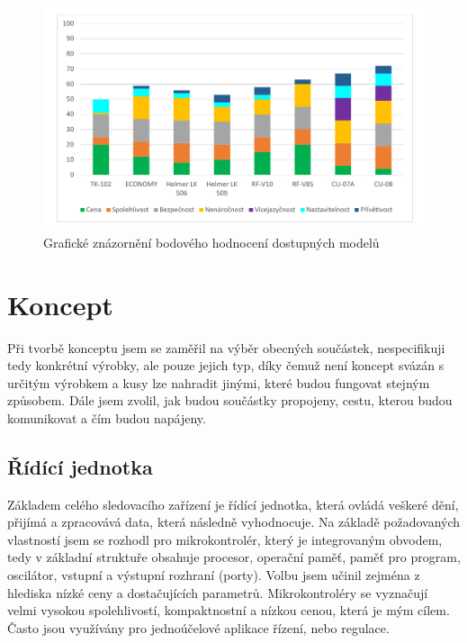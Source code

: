 \documentclass[FM,BP]{tulthesis}  %
\begin{document}
\begin{figure}[H]
\begin{center}
\includegraphics[width=\textwidth]{graphs/graf_bodoveHodnoceni.pdf}
\caption{Grafické znázornění bodového hodnocení dostupných modelů}
\label{image}
\end{center}
\end{figure}


\chapter{Koncept}
Při tvorbě konceptu jsem se zaměřil na výběr obecných součástek, nespecifikuji tedy konkrétní výrobky, ale pouze jejich typ, díky čemuž není koncept svázán s určitým výrobkem a kusy lze nahradit jinými, které budou fungovat stejným způsobem. Dále jsem zvolil, jak budou součástky propojeny, cestu, kterou budou komunikovat a čím budou napájeny.

\section{Řídící jednotka}
Základem celého sledovacího zařízení je řídící jednotka, která ovládá veškeré dění, přijímá a zpracovává data, která následně vyhodnocuje. Na základě požadovaných vlastností jsem se rozhodl pro mikrokontrolér, který je integrovaným obvodem, tedy v základní struktuře obsahuje procesor, operační paměť, paměť pro program, oscilátor, vstupní a výstupní rozhraní (porty). Volbu jsem učinil zejména z hlediska nízké ceny a dostačujících parametrů. Mikrokontroléry se vyznačují velmi vysokou spolehlivostí, kompaktnostní a nízkou cenou, která je mým cílem. Často jsou využívány pro jednoúčelové aplikace řízení, nebo regulace.
\end{document}
